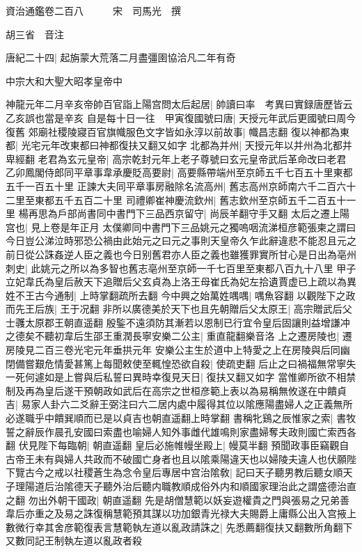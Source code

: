 資治通鑑卷二百八　　　宋　司馬光　撰

胡三省　音注

唐紀二十四|{
	起旃蒙大荒落二月盡彊圉協洽凡二年有奇}


中宗大和大聖大昭孝皇帝中

神龍元年二月辛亥帝帥百官詣上陽宫問太后起居|{
	帥讀曰率　考異曰實録唐歷皆云乙亥誤也當是辛亥}
自是每十日一往　甲寅復國號曰唐|{
	天授元年武后更國號曰周今復舊}
郊廟社稷陵寢百官旗幟服色文字皆如永淳以前故事|{
	幟昌志翻}
復以神都為東都|{
	光宅元年改東都曰神都復扶又翻又如字}
北都為并州|{
	天授元年以并州為北都并卑經翻}
老君為玄元皇帝|{
	高宗乾封元年上老子尊號曰玄元皇帝武后革命改曰老君}
乙卯鳳閣侍郎同平章事韋承慶貶高要尉|{
	高要縣帶端州至京師五千七百五十里東都五千一百五十里}
正諫大夫同平章事房融除名流高州|{
	舊志高州京師南六千二百六十二里至東都五千五百二十里}
司禮卿崔神慶流欽州|{
	舊志欽州至京師五千二百五十一里}
楊再思為戶部尚書同中書門下三品西京留守|{
	尚辰羊翻守手又翻}
太后之遷上陽宫也|{
	見上卷是年正月}
太僕卿同中書門下三品姚元之獨嗚咽流涕桓彦範張柬之謂曰今日豈公涕泣時邪恐公禍由此始元之曰元之事則天皇帝久乍此辭違悲不能忍且元之前日從公誅姦逆人臣之義也今日别舊君亦人臣之義也雖獲罪實所甘心是日出為亳州刺史|{
	此姚元之所以為多智也舊志亳州至京師一千七百里至東都八百九十八里}
甲子立妃韋氏為皇后赦天下追贈后父玄貞為上洛王母崔氏為妃左拾遺賈虚已上疏以為異姓不王古今通制|{
	上時掌翻疏所去翻}
今中興之始萬姓喁喁|{
	喁魚容翻}
以觀陛下之政而先王后族|{
	王于况翻}
非所以廣德美於天下也且先朝贈后父太原王|{
	高宗贈武后父士彠太原郡王朝直遥翻}
殷鍳不遠須防其漸若以恩制已行宜令皇后固讓則益增謙冲之德矣不聽初韋后生邵王重潤長寧安樂二公主|{
	重直龍翻樂音洛}
上之遷房陵也|{
	遷房陵見二百三卷光宅元年垂拱元年}
安樂公主生於道中上特愛之上在房陵與后同幽閉備嘗艱危情愛甚篤上每聞敕使至輒惶恐欲自殺|{
	使疏吏翻}
后止之曰禍福無常寧失一死何遽如是上嘗與后私誓曰異時幸復見天日|{
	復扶又翻又如字}
當惟卿所欲不相禁制及再為皇后遂干預朝政如武后在高宗之世桓彦範上表以為易稱無攸遂在中饋貞吉|{
	易家人卦六二爻辭王弼注曰六二居内處中履得其位以隂應陽盡婦人之正義無所必遂職乎中饋巽順而已是以貞吉也朝直遥翻上時掌翻}
書稱牝鷄之辰惟家之索|{
	書牧誓之辭辰作晨孔安國曰索盡也喻婦人知外事雌代雄鳴則家盡婦奪夫政則國亡索西各翻}
伏見陛下每臨朝|{
	朝直遥翻}
皇后必施帷幔坐殿上|{
	幔莫半翻}
預聞政事臣竊觀自古帝王未有與婦人共政而不破國亡身者也且以隂乘陽違天也以婦陵夫違人也伏願陛下覽古今之戒以社稷蒼生為念令皇后專居中宫治隂敎|{
	記曰天子聽男教后聽女順天子理陽道后治隂德天子聽外治后聽内職教順成俗外内和順國家理治此之謂盛德治直之翻}
勿出外朝干國政|{
	朝直遥翻}
先是胡僧慧範以妖妄遊權貴之門與張易之兄弟善韋后亦重之及易之誅復稱慧範預其謀以功加銀青光禄大夫賜爵上庸縣公出入宫掖上數微行幸其舍彦範復表言慧範執左道以亂政請誅之|{
	先悉薦翻復扶又翻數所角翻下又數同記王制執左道以亂政者殺}
